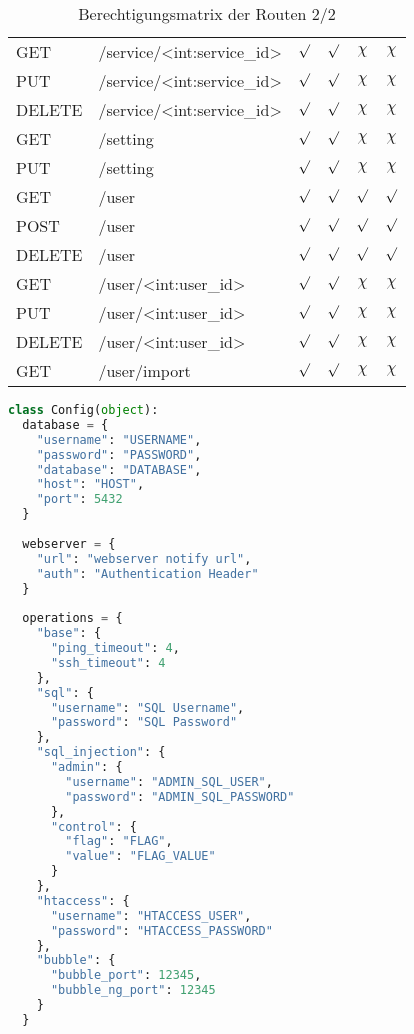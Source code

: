 \begin{table}
\begin{tabular}{l l c c c c}
		GET		& /service/<int:service\_id>		& $\surd$ & $\surd$ & $\chi$ & $\chi$ \\
		PUT		& /service/<int:service\_id>		& $\surd$ & $\surd$ & $\chi$ & $\chi$ \\
		DELETE	& /service/<int:service\_id>		& $\surd$ & $\surd$ & $\chi$ & $\chi$ \\
		GET		& /setting							& $\surd$ & $\surd$ & $\chi$ & $\chi$ \\
		PUT		& /setting							& $\surd$ & $\surd$ & $\chi$ & $\chi$ \\
		GET		& /user								& $\surd$ & $\surd$ & $\surd$ & $\surd$ \\
		POST	& /user								& $\surd$ & $\surd$ & $\surd$ & $\surd$ \\
		DELETE	& /user								& $\surd$ & $\surd$ & $\surd$ & $\surd$ \\
		GET 	& /user/<int:user\_id>				& $\surd$ & $\surd$ & $\chi$ & $\chi$ \\
		PUT 	& /user/<int:user\_id>				& $\surd$ & $\surd$ & $\chi$ & $\chi$ \\
		DELETE	& /user/<int:user\_id>				& $\surd$ & $\surd$ & $\chi$ & $\chi$ \\
		GET		& /user/import						& $\surd$ & $\surd$ & $\chi$ & $\chi$ \\
	\end{tabular}
	\caption{Berechtigungsmatrix der Routen 2/2}
	\label{table:gis-permission}
\end{table}


\begin{lstlisting}[frame=single, language=python, caption={Config Vorlage Big Brother}, captionpos=b, label={lst:anhang-bigbrother-config-example}]
class Config(object):
  database = {
    "username": "USERNAME",
    "password": "PASSWORD",
    "database": "DATABASE",
    "host": "HOST",
    "port": 5432
  }
  
  webserver = {
    "url": "webserver notify url",
    "auth": "Authentication Header"
  }
  
  operations = {
    "base": {
      "ping_timeout": 4,
      "ssh_timeout": 4
    },
    "sql": {
      "username": "SQL Username",
      "password": "SQL Password"
    },
    "sql_injection": {
      "admin": {
        "username": "ADMIN_SQL_USER",
        "password": "ADMIN_SQL_PASSWORD"
	  },
	  "control": {
	    "flag": "FLAG",
	    "value": "FLAG_VALUE"
	  }
    },
    "htaccess": {
      "username": "HTACCESS_USER",
      "password": "HTACCESS_PASSWORD"
    },
    "bubble": {
      "bubble_port": 12345,
      "bubble_ng_port": 12345
    }
  }
\end{lstlisting}

